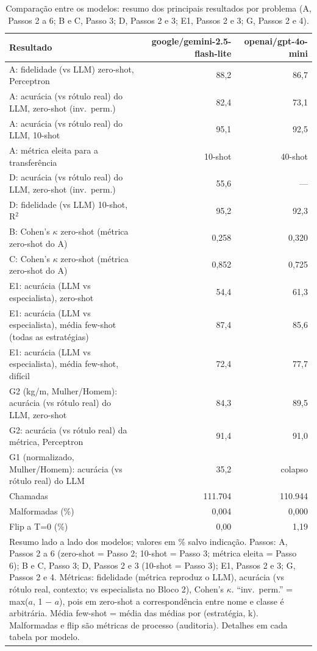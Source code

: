 \begin{table}[htbp]
\centering
\small
\caption{Comparação entre os modelos: resumo dos principais resultados por problema (A, Passos 2 a 6; B e C, Passo 3; D, Passos 2 e 3; E1, Passos 2 e 3; G, Passos 2 e 4).}
\label{tab:final_comparacao_modelos}
\begin{tabular}{lrr}
\toprule
Resultado & google/gemini-2.5-flash-lite & openai/gpt-4o-mini \\
\midrule
A: fidelidade (vs LLM) zero-shot, Perceptron & 88,2 & 86,7 \\
A: acurácia (vs rótulo real) do LLM, zero-shot (inv.\ perm.) & 82,4 & 73,1 \\
A: acurácia (vs rótulo real) do LLM, 10-shot & 95,1 & 92,5 \\
A: métrica eleita para a transferência & 10-shot & 40-shot \\
D: acurácia (vs rótulo real) do LLM, zero-shot (inv.\ perm.) & 55,6 & — \\
D: fidelidade (vs LLM) 10-shot, R$^2$ & 95,2 & 92,3 \\
B: Cohen's $\kappa$ zero-shot (métrica zero-shot do A) & 0,258 & 0,320 \\
C: Cohen's $\kappa$ zero-shot (métrica zero-shot do A) & 0,852 & 0,725 \\
E1: acurácia (LLM vs especialista), zero-shot & 54,4 & 61,3 \\
E1: acurácia (LLM vs especialista), média few-shot (todas as estratégias) & 87,4 & 85,6 \\
E1: acurácia (LLM vs especialista), média few-shot, difícil & 72,4 & 77,7 \\
G2 (kg/m, Mulher/Homem): acurácia (vs rótulo real) do LLM, zero-shot & 84,3 & 89,5 \\
G2: acurácia (vs rótulo real) da métrica, Perceptron & 91,4 & 91,0 \\
G1 (normalizado, Mulher/Homem): acurácia (vs rótulo real) do LLM & 35,2 & colapso \\
Chamadas & 111.704 & 110.944 \\
Malformadas (\%) & 0,004 & 0,000 \\
Flip a T=0 (\%) & 0,00 & 1,19 \\
\bottomrule
\multicolumn{3}{p{0.95\linewidth}}{\footnotesize Resumo lado a lado dos modelos; valores em \% salvo indicação. Passos: A, Passos 2 a 6 (zero-shot = Passo 2; 10-shot = Passo 3; métrica eleita = Passo 6); B e C, Passo 3; D, Passos 2 e 3 (10-shot = Passo 3); E1, Passos 2 e 3; G, Passos 2 e 4. Métricas: fidelidade (métrica reproduz o LLM), acurácia (vs rótulo real, contexto; vs especialista no Bloco 2), Cohen's $\kappa$. ``inv.\ perm.'' = max($a$, 1 $-$ $a$), pois em zero-shot a correspondência entre nome e classe é arbitrária. Média few-shot = média das médias por (estratégia, k). Malformadas e flip são métricas de processo (auditoria). Detalhes em cada tabela por modelo.} \\
\end{tabular}
\end{table}
